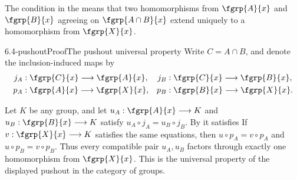 The  condition in the
 means that two homomorphisms from
$\fgrp{A}{x}$ and $\fgrp{B}{x}$ agreeing on $\fgrp{A\cap B}{x}$ extend
uniquely to a homomorphism from $\fgrp{X}{x}$.

\begin{proofpassage}{6.4-pushout}{Proof}{The pushout universal property}
Write $C=A\cap B$, and denote the inclusion-induced maps by
\[
\begin{aligned}
 j_A&:\fgrp{C}{x}\longrightarrow\fgrp{A}{x},&
 j_B&:\fgrp{C}{x}\longrightarrow\fgrp{B}{x},\\
 p_A&:\fgrp{A}{x}\longrightarrow\fgrp{X}{x},&
 p_B&:\fgrp{B}{x}\longrightarrow\fgrp{X}{x}.
\end{aligned}
\]

Let $K$ be any group, and let $u_A:\fgrp{A}{x}\longrightarrow K$ and
$u_B:\fgrp{B}{x}\longrightarrow K$ satisfy
$u_A\circ j_A=u_B\circ j_B$.  
By  it satisfies
If $v:\fgrp{X}{x}\longrightarrow K$ satisfies the same equations, then
$u\circ p_A=v\circ p_A$ and $u\circ p_B=v\circ p_B$.
  Thus every compatible pair $u_A,u_B$ factors
through exactly one homomorphism from $\fgrp{X}{x}$.  This is the universal
property of the displayed pushout in the category of groups.
\end{proofpassage}
